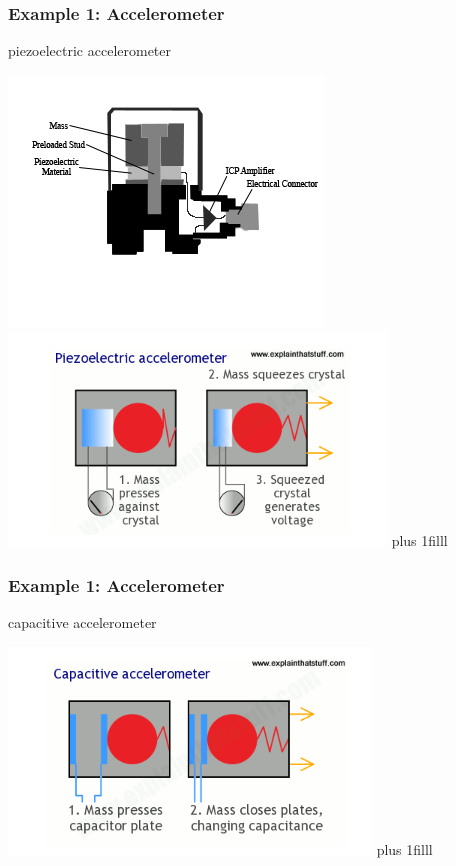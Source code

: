 \documentclass[fleqn]{beamer} %
\newcommand{\sectionIIsubsectionIIItitle}{Example 1: Accelerometer}
\newcommand{\btVFill}{\vskip0pt plus 1filll}
\begin{document}
			\begin{frame}
			\frametitle{\sectionIIsubsectionIIItitle}

				piezoelectric accelerometer                                
 
			 	\includegraphics[scale=3.5]{images/PiezoAccel.jpg} 
			 	\includegraphics[scale=.55]{images/Piezoelectric.png}
			    \btVFill

			\end{frame}

			\begin{frame}
			\frametitle{\sectionIIsubsectionIIItitle}

				capacitive accelerometer                                
 
			 	\includegraphics[scale=.55]{images/Capacitance.png}
			    \btVFill

			\end{frame}
\end{document}

